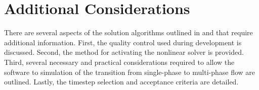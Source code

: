 %
%

\section{Additional Considerations}
\label{sect:miscConcerns}

There are several aspects of the solution algorithms outlined in  and  that require additional information.
First, the quality control used during development is discussed.
Second, the method for activating the nonlinear solver is provided.
Third, several necessary and practical considerations required to allow the software to simulation of the transition from single-phase to multi-phase flow are outlined.
Lastly, the timestep selection and acceptance criteria are detailed.

